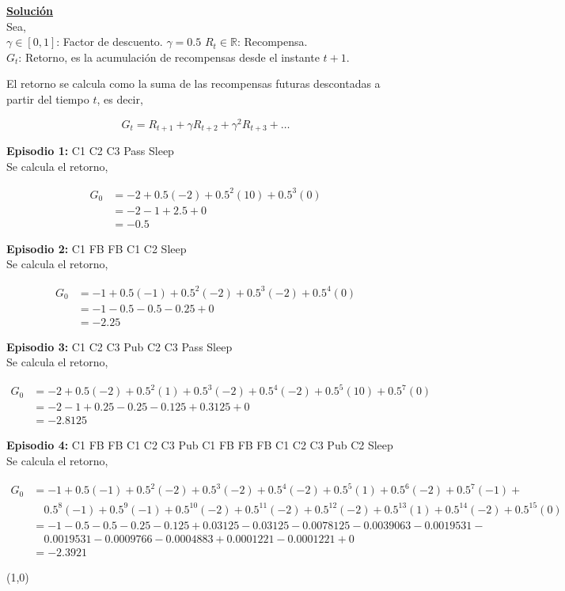 \indent\underline{\textbf{Solución}}\\
Sea,\\
$\gamma \in [0,1]$: Factor de descuento. $\gamma = 0.5$
$R_t \in \mathbb{R}$: Recompensa.\\
$G_t$: Retorno, es la acumulación de recompensas desde el instante $t+1$.

El retorno se calcula como la suma de las recompensas futuras descontadas a partir del tiempo $t$, es decir,

\[
    G_t = R_{t+1} + \gamma R_{t+2} + \gamma^2 R_{t+3} + \ldots
\]


\indent \textbf{Episodio 1:} C1 C2 C3 Pass Sleep\\
Se calcula el retorno,

\begin{align*}
    G_0 &= -2 + 0.5(-2) + 0.5^2(10) + 0.5^3(0) \\
    &= -2 - 1 + 2.5 + 0 \\
    &= -0.5
\end{align*}

\indent \textbf{Episodio 2:} C1 FB FB C1 C2 Sleep\\
Se calcula el retorno,

\begin{align*}
    G_0 &= -1 + 0.5(-1) + 0.5^2(-2) + 0.5^3(-2) + 0.5^4(0) \\
    &= -1 - 0.5 - 0.5 - 0.25 + 0 \\
    &= -2.25
\end{align*}

\indent \textbf{Episodio 3:} C1 C2 C3 Pub C2 C3 Pass Sleep\\
Se calcula el retorno,

\begin{align*}
    G_0 &= -2 + 0.5(-2) + 0.5^2(1) + 0.5^3(-2) + 0.5^4(-2) + 0.5^5(10) + 0.5^7(0) \\
    &= -2 - 1 + 0.25 - 0.25 - 0.125 + 0.3125 + 0 \\
    &= -2.8125
\end{align*}

\indent \textbf{Episodio 4:} C1 FB FB C1 C2 C3 Pub C1 FB FB FB C1 C2 C3 Pub C2 Sleep\\
Se calcula el retorno,

\begin{align*}
    G_0 &= -1 + 0.5(-1) + 0.5^2(-2) + 0.5^3(-2) + 0.5^4(-2) + 0.5^5(1) + 0.5^6(-2) + 0.5^7(-1) + \\
    & \quad 0.5^8(-1) + 0.5^9(-1) + 0.5^{10}(-2)+ 0.5^{11}(-2) + 0.5^{12}(-2) + 0.5^{13}(1) + 0.5^{14}(-2) + 0.5^{15}(0) \\
    &= -1 - 0.5 - 0.5 - 0.25 - 0.125 + 0.03125 - 0.03125 - 0.0078125 -0.0039063 - 0.0019531 - \\
    & \quad 0.0019531 - 0.0009766 - 0.0004883	+ 0.0001221 - 0.0001221 + 0 \\
    &= - 2.3921
\end{align*}

\line(1,0){\textwidth}
